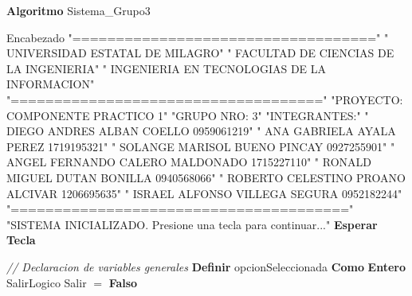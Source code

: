 \documentclass[12pt,a4paper]{article}
\newcommand{\kw}[1]{\textcolor{pseKeyword}{\textbf{#1}}}
\newcommand{\txt}[1]{\textcolor{pseString}{"#1"}}
\newcommand{\cmt}[1]{\textcolor{pseComment}{\textit{// #1}}}
\newcommand{\opAsig}{\textcolor{pseKeyword}{$=$}}
\newcommand{\Asignacion}[2]{#1\; \opAsig\; #2}
\newcommand{\Escribir}[1]{\kw{Escribir} #1}
\newcommand{\Definir}[2]{\kw{Definir} #1 \kw{Como} \kw{#2}}
\newcommand{\I}{\hspace{1.5em}}
\begin{document}
	\begin{algorithmic}[1]
		
		\State \kw{Algoritmo} Sistema\_Grupo3
		
		\State \I \kw \cmt{Encabezado}
		\State \I \kw \Escribir{\txt{===================================}}
		\State \I \kw \Escribir{\txt{           UNIVERSIDAD ESTATAL DE MILAGRO}}
		\State \I \kw \Escribir{\txt{        FACULTAD DE CIENCIAS DE LA INGENIERIA}}
		\State \I \kw \Escribir{\txt{    INGENIERIA EN TECNOLOGIAS DE LA INFORMACION}}
		\State \I \kw \Escribir{\txt{====================================}}
		\State \I \kw \Escribir{\txt{PROYECTO: COMPONENTE PRACTICO 1}}
		\State \I \kw \Escribir{\txt{GRUPO NRO: 3}}
		\State \I \kw \Escribir{\txt{INTEGRANTES:}}
		\State \I \kw \Escribir{\txt{  DIEGO ANDRES ALBAN COELLO        0959061219}}
		\State \I \kw \Escribir{\txt{  ANA GABRIELA AYALA PEREZ         1719195321}}
		\State \I \kw \Escribir{\txt{  SOLANGE MARISOL BUENO PINCAY     0927255901}}
		\State \I \kw \Escribir{\txt{  ANGEL FERNANDO CALERO MALDONADO  1715227110}}
		\State \I \kw \Escribir{\txt{  RONALD MIGUEL DUTAN BONILLA      0940568066}}
		\State \I \kw \Escribir{\txt{  ROBERTO CELESTINO PROANO ALCIVAR 1206695635}}
		\State \I \kw \Escribir{\txt{  ISRAEL ALFONSO VILLEGA SEGURA    0952182244}}
		\State \I \kw \Escribir{\txt{=======================================}}
		\State \I \kw \Escribir{\txt{SISTEMA INICIALIZADO. Presione una tecla para continuar...}}
		\State \I \kw{Esperar Tecla}
		\State
		
		\State \I \cmt{Declaracion de variables generales}
		\State \I \Definir{opcionSeleccionada}{Entero}
		\State \I \kw \Definir{Salir}{Logico}
		\State \I \Asignacion{Salir}{\kw{Falso}}
		

\end{algorithmic}
\end{document}
